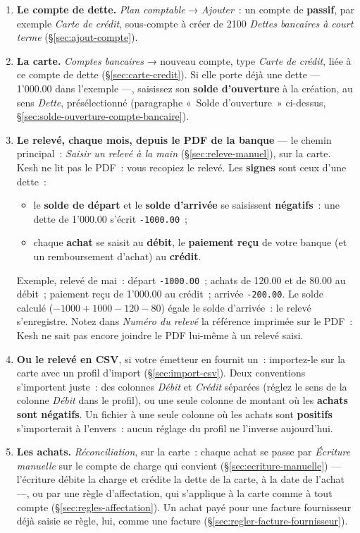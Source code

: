 \documentclass[a4paper,11pt,oneside]{article}
\begin{document}
\begin{enumerate}
    \item \textbf{Le compte de dette.} \emph{Plan comptable} → \emph{Ajouter}~: un compte de \textbf{passif}, par exemple \emph{Carte de crédit}, sous-compte à créer de 2100 \emph{Dettes bancaires à court terme} (\S\ref{sec:ajout-compte}).
    \item \textbf{La carte.} \emph{Comptes bancaires} → nouveau compte, type \emph{Carte de crédit}, liée à ce compte de dette (\S\ref{sec:carte-credit}). Si elle porte déjà une dette --- 1'000.00 dans l'exemple ---, saisissez son \textbf{solde d'ouverture} à la création, au sens \emph{Dette}, présélectionné (paragraphe «~Solde d'ouverture~» ci-dessus, \S\ref{sec:solde-ouverture-compte-bancaire}).
    \item \textbf{Le relevé, chaque mois, depuis le PDF de la banque} --- le chemin principal~: \emph{Saisir un relevé à la main} (\S\ref{sec:releve-manuel}), sur la carte. Kesh ne lit pas le PDF~: vous recopiez le relevé. Les \textbf{signes} sont ceux d'une dette~:
    \begin{itemize}
        \item le \textbf{solde de départ} et le \textbf{solde d'arrivée} se saisissent \textbf{négatifs}~: une dette de 1'000.00 s'écrit \texttt{-1000.00}~;
        \item chaque \textbf{achat} se saisit au \textbf{débit}, le \textbf{paiement reçu} de votre banque (et un remboursement d'achat) au \textbf{crédit}.
    \end{itemize}
    Exemple, relevé de mai~: départ \texttt{-1000.00}~; achats de 120.00 et de 80.00 au débit~; paiement reçu de 1'000.00 au crédit~; arrivée \texttt{-200.00}. Le solde calculé ($-1000 + 1000 - 120 - 80$) égale le solde d'arrivée~: le relevé s'enregistre. Notez dans \emph{Numéro du relevé} la référence imprimée sur le PDF~: Kesh ne sait pas encore joindre le PDF lui-même à un relevé saisi.
    \item \textbf{Ou le relevé en CSV}, si votre émetteur en fournit un~: importez-le sur la carte avec un profil d'import (\S\ref{sec:import-csv}). Deux conventions s'importent juste~: des colonnes \emph{Débit} et \emph{Crédit} séparées (réglez le sens de la colonne \emph{Débit} dans le profil), ou une seule colonne de montant où les \textbf{achats sont négatifs}. Un fichier à une seule colonne où les achats sont \textbf{positifs} s'importerait à l'envers~: aucun réglage du profil ne l'inverse aujourd'hui.
    \item \textbf{Les achats.} \emph{Réconciliation}, sur la carte~: chaque achat se passe par \emph{Écriture manuelle} sur le compte de charge qui convient (\S\ref{sec:ecriture-manuelle}) --- l'écriture débite la charge et crédite la dette de la carte, à la date de l'achat ---, ou par une règle d'affectation, qui s'applique à la carte comme à tout compte (\S\ref{sec:regles-affectation}). Un achat payé pour une facture fournisseur déjà saisie se règle, lui, comme une facture (\S\ref{sec:regler-facture-fournisseur}).

\end{enumerate}
\end{document}
